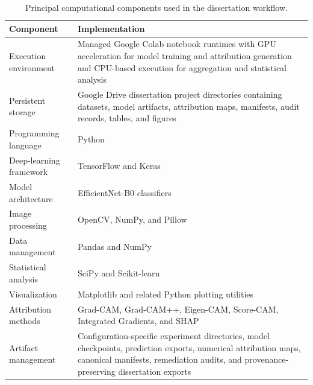 \begin{table}[H]
\centering
\caption{Principal computational components used in the dissertation workflow.}
\label{tab:computational_environment}

\small
\renewcommand{\arraystretch}{1.20}
\setlength{\tabcolsep}{5pt}

\begin{tabular}{p{3.7cm}p{8.3cm}}
\toprule
\textbf{Component} & \textbf{Implementation} \\
\midrule

Execution environment
& Managed Google Colab notebook runtimes with GPU acceleration for model training and attribution generation and CPU-based execution for aggregation and statistical analysis \\

Persistent storage
& Google Drive dissertation project directories containing datasets, model artifacts, attribution maps, manifests, audit records, tables, and figures \\

Programming language
& Python \\

Deep-learning framework
& TensorFlow and Keras \\

Model architecture
& EfficientNet-B0 classifiers \\

Image processing
& OpenCV, NumPy, and Pillow \\

Data management
& Pandas and NumPy \\

Statistical analysis
& SciPy and Scikit-learn \\

Visualization
& Matplotlib and related Python plotting utilities \\

Attribution methods
& Grad-CAM, Grad-CAM++, Eigen-CAM, Score-CAM, Integrated Gradients, and SHAP \\

Artifact management
& Configuration-specific experiment directories, model checkpoints, prediction exports, numerical attribution maps, canonical manifests, remediation audits, and provenance-preserving dissertation exports \\

\bottomrule
\end{tabular}
\end{table}